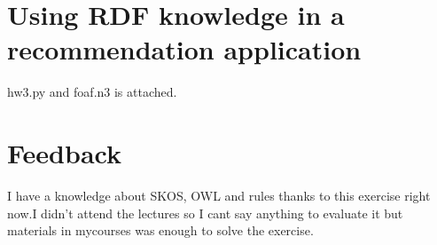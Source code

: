 \documentclass{article}
\begin{document}
\section{Using RDF knowledge in a recommendation application}
hw3.py and foaf.n3 is attached.

\section{Feedback}
I have a knowledge about SKOS, OWL and rules thanks to this exercise right now.I didn't attend the lectures so I cant say anything to evaluate it but materials in mycourses was enough to solve the exercise.
\end{document}
